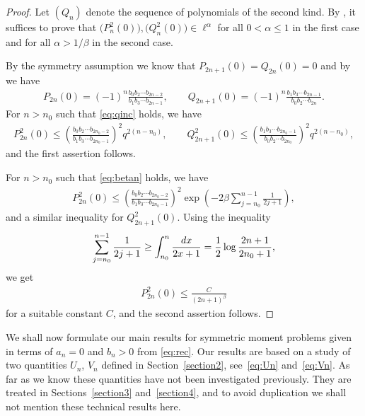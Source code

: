 \documentclass[11pt]{article}
\numberwithin{equation}{section}
\begin{document}
\begin{proof} Let $(Q_n)$ denote the sequence of polynomials of the second kind. By \cite[Theorem~1.2]{B:S2}, it suffices to prove that $\big(P_n^2(0)\big), \big(Q_n^2(0)\big)\in\ell^\alpha$ for all $0<\alpha\le 1$ in the first case and for all $\alpha>1/\beta$ in the second case.

 By the symmetry assumption we know that $P_{2n+1}(0)=Q_{2n}(0)=0$ and by \cite[Remark 4.5]{B:S2} we have
\begin{gather}\label{eq:P2n(0)}
P_{2n}(0)=(-1)^n\frac{b_0b_2\cdots b_{2n-2}}{b_1b_3\cdots b_{2n-1}},\qquad Q_{2n+1}(0)=(-1)^n\frac{b_1b_3\cdots b_{2n-1}}{b_0b_2\cdots b_{2n}}.
\end{gather}
For $n>n_0$ such that \eqref{eq:qinc} holds, we have
\begin{gather*}
P_{2n}^2(0)\le \left(\frac{b_0b_2\cdots b_{2n_0-2}}{b_1b_3\cdots b_{2n_0-1}}\right)^2q^{2(n-n_0)},\qquad
Q_{2n+1}^2(0)\le \left(\frac{b_1b_3\cdots b_{2n_0-1}}{b_0b_2\cdots b_{2n_0}}\right)^2 q^{2(n-n_0)},
\end{gather*}
and the first assertion follows.

For $n>n_0$ such that \eqref{eq:betan} holds, we have
\begin{gather*}
P_{2n}^2(0)\le \left(\frac{b_0b_2\cdots b_{2n_0-2}}{b_1b_3\cdots b_{2n_0-1}}\right)^2\exp\left(-2\beta\sum_{j=n_0}^{n-1}\frac{1}{2j+1}\right),
\end{gather*}
and a similar inequality for $Q_{2n+1}^2(0)$. Using the inequality
\begin{gather*}
\sum_{j=n_0}^{n-1}\frac{1}{2j+1}\ge \int_{n_0}^n\frac{{\rm d}x}{2x+1}=\frac12\log\frac{2n+1}{2n_0+1},
\end{gather*}
we get
\begin{gather*}
P_{2n}^2(0)\le \frac{C}{(2n+1)^\beta}
\end{gather*}
for a suitable constant $C$, and the second assertion follows.
\end{proof}

\setcounter{section}{1}
\setcounter{subsection}{0}
\setcounter{subsubsection}{0}
\setcounter{thm}{8}
\setcounter{equation}{9}
We shall now formulate our main results for symmetric moment problems given in terms of $a_n=0$ and $b_n>0$ from \eqref{eq:rec}. Our results are based on a study of two quantities $U_n$, $V_n$ defined in Section~\ref{section2}, see~\eqref{eq:Un} and~\eqref{eq:Vn}. As far as we know these quantities have not been investigated previously. They are treated in Sections~\ref{section3} and~\ref{section4}, and to avoid duplication we shall not mention these technical results here.
\end{document}
